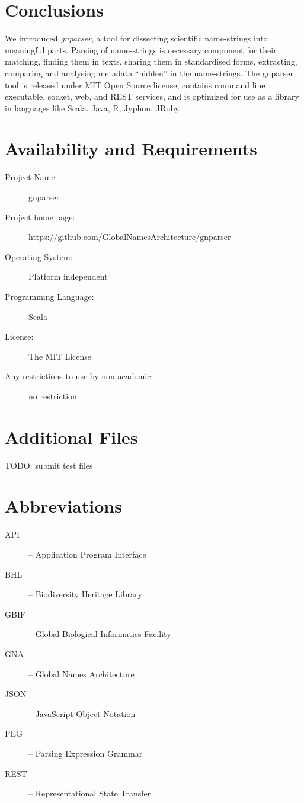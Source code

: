 \documentclass{bmcart}
\begin{document}
\section*{Conclusions}

We introduced \textit{gnparser}, a tool for dissecting scientific name-strings
into meaningful parts. Parsing of name-strings is necessary component for their
matching, finding them in texts, sharing them in standardised forms,
extracting, comparing and analysing metadata ``hidden'' in the name-strings.
The gnparser tool is released under MIT Open Source license, contains command
line executable, socket, web, and REST services, and is optimized for use as a
library in languages like Scala, Java, R, Jyphon, JRuby.

\section*{Availability and Requirements}

\begin{description}
  \item[Project Name:] gnparser
  \item[Project home page:] https://github.com/GlobalNamesArchitecture/gnparser
  \item[Operating System:] Platform independent
  \item[Programming Language:] Scala
  \item[License:] The MIT License
  \item[Any restrictions to use by non-academic:] no restriction
\end{description}

\section*{Additional Files}

TODO: submit test files

\section*{Abbreviations}

\begin{description}
  \item[API] -- Application Program Interface
  \item[BHL] -- Biodiversity Heritage Library
  \item[GBIF] -- Global Biological Informatics Facility
  \item[GNA] -- Global Names Architecture
  \item[JSON] -- JavaScript Object Notation
  \item[PEG] -- Parsing Expression Grammar
  \item[REST] -- Representational State Transfer
\end{description}
\end{document}
